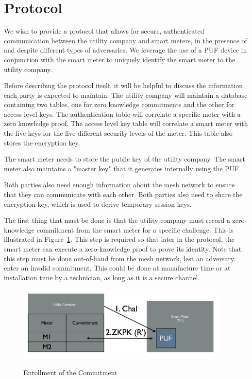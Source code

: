 \section{Protocol}
We wish to provide a protocol that allows for secure, authenticated communication between the utility company and
smart meters, in the presence of and despite different types of adversaries.
We leverage the use of a PUF device in conjunction with the smart meter to uniquely identify the smart meter to the
utility company.

Before describing the protocol itself, it will be helpful to discuss the information each party is expected to maintain.
The utility company will maintain a database containing two tables, one for zero knowledge commitments and the 
other for 
access level keys. The authentication table will correlate a specific meter with a zero knowledge proof.
The access level key table will correlate a smart meter with the five keys for the five different security levels of the 
meter. This table also stores the encryption key.

The smart meter needs to store the public key of the utility company. The smart meter also maintains a "master key"
that it generates internally using the PUF. 

Both parties also need enough information about
the mesh network to ensure that they can communicate with each other. Both parties also need to share the
encryption key, which is used to derive temporary session keys.

The first thing that must be done is that the utility company must record a zero-knowledge commitment from the 
smart meter for a specific challenge. This is illustrated in Figure~\ref{fig:doeconfig}. This step is required so that later
in the protocol, the smart meter can execute a zero-knowledge proof to prove its identity.
Note that this step must be done out-of-band from the mesh network, lest an adversary enter an invalid commitment.
This could be done at manufacture time or at installation time by a technician, as long as it is a secure channel.

\begin{figure}[!ht]
\includegraphics[width=400px]{images/doe_auth_config.jpg}
\label{fig:doeconfig}
\caption{Enrollment of the Commitment}
\end{figure}
\FloatBarrier


